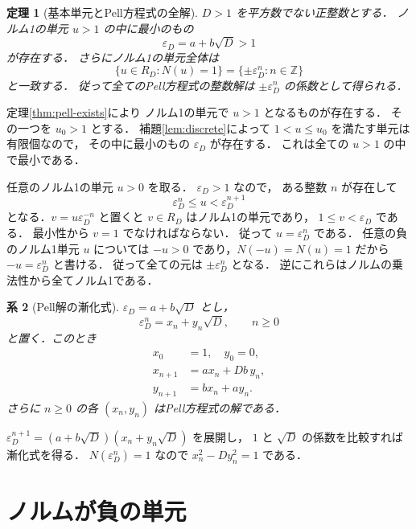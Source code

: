 \documentclass[a5paper,10pt,onecolumn]{jsarticle}
\makeatletter
\theoremstyle{mathnotetheorem}
\newtheorem{theorem}{定理}[section]
\newtheorem{corollary}[theorem]{系}
\renewcommand{\proofname}{証明}
\renewenvironment{proof}[1][\proofname]{%
  \par\pushQED{\qed}\normalfont\topsep4\p@\@plus2\p@\relax
  \trivlist\item[\hskip\labelsep\bfseries #1]\ignorespaces
}{\popQED\endtrivlist\@endpefalse}
\makeatother
\begin{document}
\begin{theorem}[基本単元とPell方程式の全解]\label{thm:fundamental}
$D>1$ を平方数でない正整数とする．
ノルム1の単元 $u>1$ の中に最小のもの
\[
 \varepsilon_D=a+b\sqrt D>1
\]
が存在する．
さらにノルム1の単元全体は
\[
 \{u\in R_D:N(u)=1\}
 =\{\pm\varepsilon_D^n:n\in\mathbb Z\}
\]
と一致する．
従って全てのPell方程式の整数解は
$\pm\varepsilon_D^n$ の係数として得られる．
\end{theorem}
\begin{proof}
定理\ref{thm:pell-exists}により
ノルム1の単元で $u>1$ となるものが存在する．
その一つを $u_0>1$ とする．
補題\ref{lem:discrete}によって
$1<u\le u_0$ を満たす単元は有限個なので，
その中に最小のもの $\varepsilon_D$ が存在する．
これは全ての $u>1$ の中で最小である．

任意のノルム1の単元 $u>0$ を取る．
$\varepsilon_D>1$ なので，
ある整数 $n$ が存在して
\[
 \varepsilon_D^n\le u<\varepsilon_D^{n+1}
\]
となる．$v=u\varepsilon_D^{-n}$ と置くと
$v\in R_D$ はノルム1の単元であり，
$1\le v<\varepsilon_D$ である．
最小性から $v=1$ でなければならない．
従って $u=\varepsilon_D^n$ である．
任意の負のノルム1単元 $u$ については
$-u>0$ であり，$N(-u)=N(u)=1$ だから
$-u=\varepsilon_D^n$ と書ける．
従って全ての元は $\pm\varepsilon_D^n$ となる．
逆にこれらはノルムの乗法性から全てノルム1である．
\end{proof}

\begin{corollary}[Pell解の漸化式]\label{cor:recurrence}
$\varepsilon_D=a+b\sqrt D$ とし，
\[
 \varepsilon_D^n=x_n+y_n\sqrt D,\qquad n\ge0
\]
と置く．このとき
\begin{align*}
 x_0&=1,\quad y_0=0,\\
 x_{n+1}&=ax_n+Db\,y_n,\\
 y_{n+1}&=bx_n+ay_n.
\end{align*}
さらに $n\ge0$ の各 $(x_n,y_n)$ はPell方程式の解である．
\end{corollary}
\begin{proof}
$\varepsilon_D^{n+1}
 =(a+b\sqrt D)(x_n+y_n\sqrt D)$ を展開し，
$1$ と $\sqrt D$ の係数を比較すれば漸化式を得る．
$N(\varepsilon_D^n)=1$ なので
$x_n^2-Dy_n^2=1$ である．
\end{proof}

\section{ノルムが負の単元}
\end{document}
